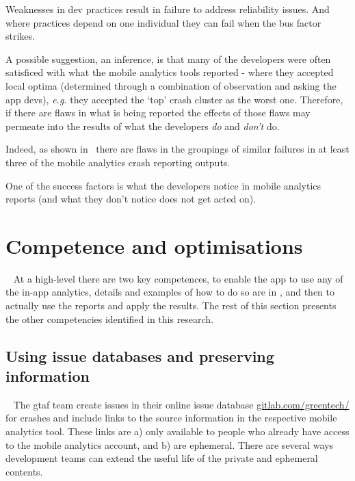 Weaknesses in dev practices result in failure to address reliability issues. And where practices depend on one individual they can fail when the bus factor strikes. 

A possible suggestion, an inference, is that many of the developers were often satisficed with what the mobile analytics tools reported - where they accepted local optima (determined through a combination of observation and asking the app devs), \textit{e.g.} they accepted the `top' crash cluster as the worst one. Therefore, if there are flaws in what is being reported the effects of those flaws may permeate into the results of what the developers \textit{do} and \textit{don't} do.

Indeed, as shown in~ there are flaws in the groupings of similar failures in at least three of the mobile analytics crash reporting outputs.

One of the success factors is what the developers notice in mobile analytics reports (and what they don't notice does not get acted on).


\section{Competence and optimisations}~\label{aiu-competence-and-optimisations-section}
At a high-level there are two key competences, to enable the app to use any of the in-app analytics, details and examples of how to do so are in , and then to actually use the reports and apply the results. The rest of this section presents the other competencies identified in this research.

\subsection{Using issue databases and preserving information}~\label{aiu-using-issue-databases-and-preserving-information-topics}
The \Gls{gtaf} team create issues in their online issue database \href{https://gitlab.com/greentech/}{gitlab.com/greentech/} for crashes and include links to the source information in the respective mobile analytics tool. These links are a) only available to people who already have access to the mobile analytics account, and b) are ephemeral. There are several ways development teams can extend the useful life of the private and ephemeral contents. 

